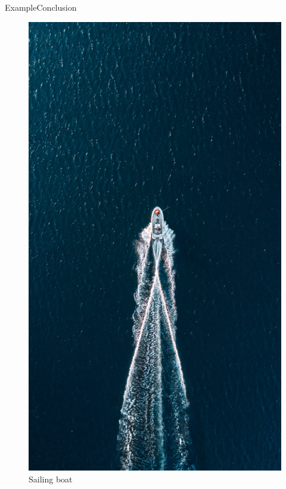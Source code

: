 \documentclass[9pt, xcolor={usenames, dvipsnames}]{beamer}
\begin{document}
\begin{frame}{Example}{Conclusion}
\begin{minipage}[c]{0.3\textwidth}
\begin{figure}
						\includegraphics[width=\textwidth]{images/boat_end.jpg}
						\caption{Sailing boat}
					\end{figure}
				\end{minipage}
			\end{frame}

	\titlepage
\end{document}
